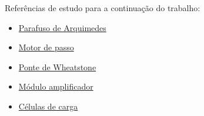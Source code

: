 Referências de estudo para a continuação do trabalho:
\renewcommand{\labelitemi}{$\cdot$}
\begin{itemize}
    \item \href{https://www.youtube.com/watch?v=fHzWA9GLAkc}{Parafuso de Arquimedes}
    \item \href{https://www.youtube.com/watch?v=o4i_vMHziBw}{Motor de passo}
    \item \href{https://www.micro-tess.com/wheatstone-bridge/}{Ponte de Wheatstone}
    \item \href{https://docs.soldered.com/hx711/overview/}{Módulo amplificador}
    \item \href{https://www.youtube.com/watch?v=dNiVZBTvwxs}{Células de carga} 
\end{itemize}